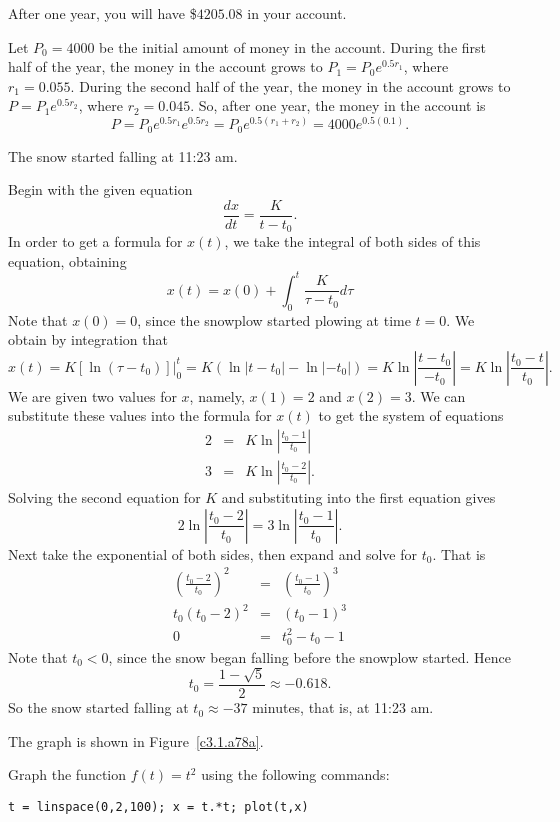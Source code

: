 \documentclass{ximera}
\begin{document}
 \ans After one year, you will have \$$4205.08$ in your account.

\soln Let $P_0 = 4000$ be the initial amount of money in the account. 
During the first half of the year, the money in the account grows to $P_1 =
P_0e^{0.5r_1}$, where $r_1 = 0.055$.  During the second half of the year,
the money in the account grows to $P = P_1e^{0.5r_2}$, where $r_2 = 0.045$.
So, after one year, the money in the account is
\[
P = P_0e^{0.5r_1}e^{0.5r_2} = P_0e^{0.5(r_1 + r_2)} = 4000e^{0.5(0.1)}.
\]

\ans The snow started falling at 11:23 am.

\soln Begin with the given equation
\[
\frac{dx}{dt} = \frac{K}{t-t_0}.
\]
In order to get a formula for $x(t)$, we take the integral of both sides of
this equation, obtaining
\[
x(t) = x(0) + \int_{0}^{t} \frac{K}{\tau-t_0} d\tau
\]
Note that $x(0) = 0$, since the snowplow started plowing at time $t=0$.  We
obtain by integration that
\[
x(t) = \left.K[\ln(\tau - t_0)]\right|_{0}^{t} = K(\ln|t - t_0| - \ln|-t_0|) = 
K\ln\left|\frac{t - t_0}{-t_0}\right| = K\ln\left|\frac{t_0-t}{t_0}\right|.
\]
We are given two values for $x$, namely, $x(1) = 2$ and $x(2) = 3$.  We can
substitute these values into the formula for $x(t)$ to get the system of 
equations
\[
\begin{array}{rcl}
2 & = & K\ln\left|\frac{t_0 - 1}{t_0}\right| \\
3 & = & K\ln\left|\frac{t_0 - 2}{t_0}\right|.
\end{array}
\]
Solving the second equation for $K$ and substituting into the first equation 
gives
\[
2\ln\left|\frac{t_0 - 2}{t_0}\right| = 3\ln\left|\frac{t_0 - 1}{t_0}\right|.
\]
Next take the exponential of both sides, then expand and solve for $t_0$. 
That is
\[
\begin{array}{rcl}
\left(\frac{t_0 - 2}{t_0}\right)^2 & = & \left(\frac{t_0 - 1}{t_0}\right)^3 \\
t_0\left(t_0 - 2\right)^2 & = & \left(t_0 - 1\right)^3 \\
0 & = & t_0^2 - t_0 - 1 \end{array}
\]
Note that $t_0 < 0$, since the snow began falling before the snowplow
started.  Hence
\[
t_0 = \frac{1 - \sqrt{5}}{2} \approx -0.618.
\]
So the snow started falling at $t_0 \approx -37$ minutes, that is, at
11:23 am.


\ans The graph is shown in Figure~\ref{c3.1.a78a}.

\soln Graph the function $f(t) = t^2$ using the following \Matlab commands:
\begin{verbatim}
t = linspace(0,2,100); x = t.*t; plot(t,x)
\end{verbatim}
\end{document}

